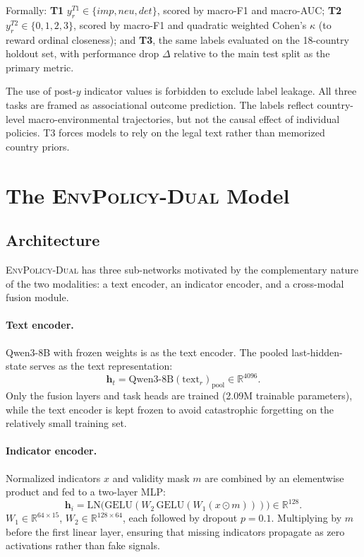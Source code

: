 \documentclass[11pt]{article}
\newcommand{\ours}{\textsc{EnvPolicy-Dual}}
\begin{document}
Formally: \textbf{T1} $y^{T1}_r\in\{imp,neu,det\}$, scored by macro-F1 and macro-AUC; \textbf{T2} $y^{T2}_r\in\{0,1,2,3\}$, scored by macro-F1 and quadratic weighted Cohen's $\kappa$ (to reward ordinal closeness); and \textbf{T3}, the same labels evaluated on the 18-country holdout set, with performance drop $\Delta$ relative to the main test split as the primary metric.


The use of post-$y$ indicator values is forbidden to exclude label leakage. All three tasks are framed as associational outcome prediction. The labels reflect country-level macro-environmental trajectories, but not the causal effect of individual policies. T3 forces models to rely on the legal text rather than memorized country priors.


\section{The \ours{} Model}
\label{sec:model}

\subsection{Architecture}

\ours{} has three sub-networks motivated by the complementary nature of the two modalities: a text encoder, an indicator encoder, and a cross-modal fusion module.

\paragraph{Text encoder.}
Qwen3-8B \citep{qwen2025} with frozen weights is as the text encoder. The pooled last-hidden-state serves as the text representation:
\begin{equation}
\mathbf{h}_t = \text{Qwen3-8B}(\text{text}_r)_{\text{pool}}\in\mathbb{R}^{4096}.
\end{equation}
Only the fusion layers and task heads are trained (2.09M trainable parameters), while the text encoder is kept frozen to avoid catastrophic forgetting on the relatively small training set.

\paragraph{Indicator encoder.}
Normalized indicators $x$ and validity mask $m$ are combined by an elementwise product and fed to a two-layer MLP:
\begin{equation}
\mathbf{h}_i = \text{LN}\!\bigl(\text{GELU}(W_2\,\text{GELU}(W_1(x\odot m)))\bigr)\in\mathbb{R}^{128}.
\end{equation}
$W_1\in\mathbb{R}^{64\times 15}$, $W_2\in\mathbb{R}^{128\times 64}$, each followed by dropout $p=0.1$. Multiplying by $m$ before the first linear layer, ensuring that missing indicators propagate as zero activations rather than fake signals.
\end{document}
